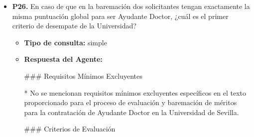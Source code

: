 \documentclass{article}
\begin{document}
\begin{itemize}
\begin{itemize}
                        \#\#\# Desglose de la Actividad Profesional Externa a la Universidad (Bloque V):

                        La experiencia profesional o laboral se evalúa dentro del Bloque V, que tiene un peso relativo del 55\% en la nota final del proceso para la figura de Profesor Asociado. Este bloque se refiere a la actividad profesional externa a la universidad, lo que incluye experiencia laboral en el sector privado, instituciones públicas, o cualquier otra actividad profesional relevante fuera del ámbito académico universitario.

                        \#\#\# Porcentaje de Peso Relativo de la Experiencia Profesional o Laboral:

                        El porcentaje de peso relativo de la experiencia profesional o laboral en la nota final del proceso para la figura de Profesor Asociado es del 55\%. Esto significa que más de la mitad de la puntuación total se basa en la evaluación de la experiencia profesional o laboral del candidato, lo que destaca la importancia de esta experiencia en el proceso de selección para esta figura contractual.
                  \item \textbf{Contexto utilizado:}

            \end{itemize}

      \item \textbf{P26.} En caso de que en la baremación dos solicitantes tengan exactamente la misma puntuación global para ser Ayudante Doctor, ¿cuál es el primer criterio de desempate de la Universidad? \\
            \begin{itemize}
                  \item \textbf{Tipo de consulta:} simple
                  \item \textbf{Respuesta del Agente:}

                        \#\#\# Requisitos Mínimos Excluyentes

                        *   No se mencionan requisitos mínimos excluyentes específicos en el texto proporcionado para el proceso de evaluación y baremación de méritos para la contratación de Ayudante Doctor en la Universidad de Sevilla.

                        \#\#\# Criterios de Evaluación


\end{itemize}
\end{itemize}
\end{document}
